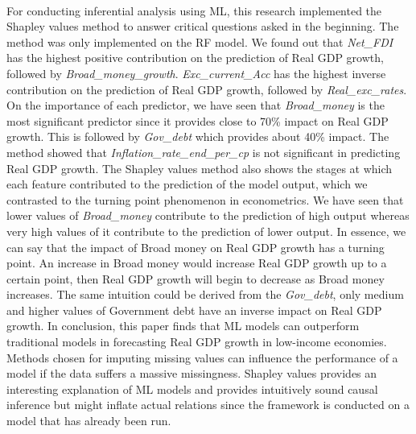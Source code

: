 \documentclass[12pt,italian, twoside]{report}
\begin{document}
\\
For conducting inferential analysis using ML, this research implemented the Shapley values method to answer critical questions asked in the beginning. The method was only implemented on the RF model. We found out that \textit{Net\_FDI} has the highest positive contribution on the prediction of Real GDP growth, followed by \textit{Broad\_money\_growth}. \textit{Exc\_current\_Acc} has the highest inverse contribution on the prediction of Real GDP growth, followed by \textit{Real\_exc\_rates}. On the importance of each predictor, we have seen that \textit{Broad\_money} is the most significant predictor since it provides close to 70\% impact on Real GDP growth. This is followed by \textit{Gov\_debt} which provides about 40\% impact. The method showed that \textit{Inflation\_rate\_end\_per\_cp} is not significant in predicting Real GDP growth. The Shapley values method also shows the stages at which each feature contributed to the prediction of the model output, which we contrasted to the turning point phenomenon in econometrics. We have seen that lower values of \textit{Broad\_money} contribute to the prediction of high output whereas very high values of it contribute to the prediction of lower output. In essence, we can say that the impact of Broad money on Real GDP growth has a turning point. An increase in Broad money would increase Real GDP growth up to a certain point, then Real GDP growth will begin to decrease as Broad money increases. The same intuition could be derived from the \textit{Gov\_debt}, only medium and higher values of Government debt have an inverse impact on Real GDP growth.
In conclusion, this paper finds that ML models can outperform traditional models in forecasting Real GDP growth in low-income economies. Methods chosen for imputing missing values can influence the performance of a model if the data suffers a massive missingness. Shapley values provides an interesting explanation of ML models and provides intuitively sound causal inference but might inflate actual relations since the framework is conducted on a model that has already been run.



% 
% 

\appendix
\end{document}
